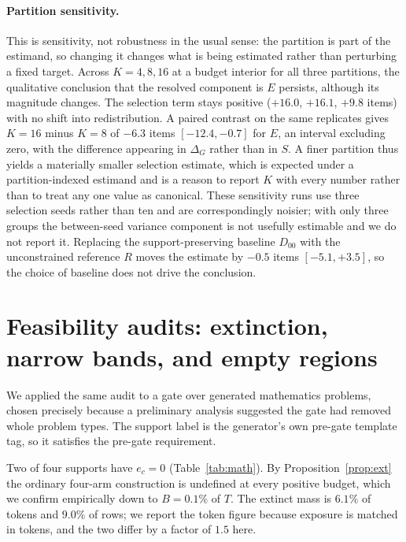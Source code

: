 \documentclass[10pt,twocolumn]{article}
\begin{document}
\paragraph{Partition sensitivity.}
This is sensitivity, not robustness in the usual sense: the partition is part of the estimand,
so changing it changes what is being estimated rather than perturbing a fixed target. Across
$K=4,8,16$ at a budget interior for all three partitions, the qualitative conclusion that the
resolved component is $E$ persists, although its magnitude changes. The selection term stays
positive
($+16.0$, $+16.1$, $+9.8$ items) with no shift into redistribution. A paired contrast on the
same replicates gives $K{=}16$ minus $K{=}8$ of $-6.3$ items $[-12.4,-0.7]$ for $E$, an interval
excluding zero, with the difference appearing in $\Delta_G$ rather than in $S$. A finer
partition thus yields a materially smaller selection estimate, which is expected under a
partition-indexed estimand and is a reason to report $K$ with every number rather than to treat
any one value as canonical. These sensitivity runs use three selection seeds rather than ten and
are correspondingly noisier; with only three groups the between-seed variance component is not
usefully estimable and we do not report it. Replacing the support-preserving baseline $D_{00}$
with the unconstrained reference $R$ moves the estimate by $-0.5$ items $[-5.1,+3.5]$, so the
choice of baseline does not drive the conclusion.

\section{Feasibility audits: extinction, narrow bands, and empty regions}
\label{sec:math}

We applied the same audit to a gate over generated mathematics problems, chosen precisely
because a preliminary analysis suggested the gate had removed whole problem types. The support
label is the generator's own pre-gate template tag, so it satisfies the pre-gate requirement.

Two of four supports have $e_c=0$ (Table~\ref{tab:math}). By Proposition~\ref{prop:ext} the
ordinary four-arm construction is undefined at every positive budget, which we confirm
empirically down to $B=0.1\%$ of $T$. The extinct mass is $6.1\%$ of tokens and $9.0\%$ of rows;
we report the token figure because exposure is matched in tokens, and the two differ by a factor
of $1.5$ here.
\end{document}
